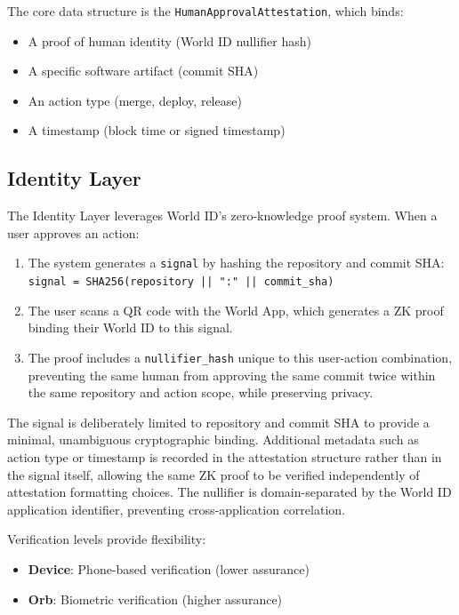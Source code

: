 \documentclass[conference]{IEEEtran}
\begin{document}
The core data structure is the \texttt{HumanApprovalAttestation}, which binds:
\begin{itemize}
    \item A proof of human identity (World ID nullifier hash)
    \item A specific software artifact (commit SHA)
    \item An action type (merge, deploy, release)
    \item A timestamp (block time or signed timestamp)
\end{itemize}

\subsection{Identity Layer}

The Identity Layer leverages World ID's zero-knowledge proof system. When a user approves an action:

\begin{enumerate}
    \item The system generates a \texttt{signal} by hashing the repository and commit SHA: \\ \texttt{signal = SHA256(repository || ":" || commit\_sha)}
    \item The user scans a QR code with the World App, which generates a ZK proof binding their World ID to this signal.
    \item The proof includes a \texttt{nullifier\_hash} unique to this user-action combination, preventing the same human from approving the same commit twice within the same repository and action scope, while preserving privacy.
\end{enumerate}

The signal is deliberately limited to repository and commit SHA to provide a minimal, unambiguous cryptographic binding.
Additional metadata such as action type or timestamp is recorded in the attestation structure rather than in the signal itself, allowing the same ZK proof to be verified independently of attestation formatting choices.
The nullifier is domain-separated by the World ID application identifier, preventing cross-application correlation.

Verification levels provide flexibility:
\begin{itemize}
    \item \textbf{Device}: Phone-based verification (lower assurance)
    \item \textbf{Orb}: Biometric verification (higher assurance)
\end{itemize}
\end{document}
